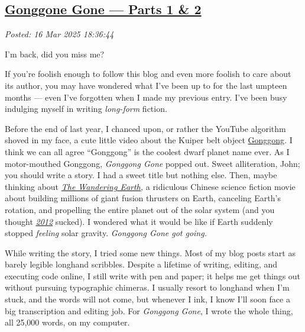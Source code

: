 %

\subsection*{\href{http://analyzethedatanotthedrivel.org/2025/03/16/gonggone-gone-parts-1-2/}{Gonggone Gone --- Parts 1 \& 2}}


\noindent\emph{Posted: 16 Mar 2025 18:36:44}
\vspace{6pt}

I'm back, did you miss me?

If you're foolish enough to follow this blog and even more foolish to
care about its author, you may have wondered what I've been up to for
the last umpteen months --- even I've forgotten when I made my previous
entry. I've been busy indulging myself in writing \emph{long-form}
fiction.

Before the end of last year, I chanced upon, or rather the YouTube
algorithm shoved in my face, a cute little video about the Kuiper belt
object
\href{https://duckduckgo.com/?q=gonggong&t=brave&iax=videos&iai=https\%3A\%2F\%2Fwww.youtube.com\%2Fwatch\%3Fv\%3DNQUMmEMOk-c&ia=videos}{Gonggong}.
I think we can all agree ``Gonggong'' is the coolest dwarf planet name
ever. As I motor-mouthed Gonggong, \emph{Gonggong Gone} popped out.
Sweet alliteration, John; you should write a story. I had a sweet title
but nothing else. Then, maybe thinking about
\emph{\href{https://www.imdb.com/title/tt7605074/}{The Wandering
Earth,}} a ridiculous Chinese science fiction movie about building
millions of giant fusion thrusters on Earth, canceling Earth's rotation,
and propelling the entire planet out of the solar system (and you
thought
\href{https://www.imdb.com/title/tt1190080/?ref_=fn_all_ttl_1}{\emph{2012}}
sucked). I wondered what it would be like if Earth suddenly stopped
\emph{feeling} solar gravity. \emph{Gonggong Gone got going.}

While writing the story, I tried some new things. Most of my blog posts
start as barely legible longhand scribbles. Despite a lifetime of
writing, editing, and executing code online, I still write with pen and
paper; it helps me get things out without pursuing typographic chimeras.
I usually resort to longhand when I'm stuck, and the words will not
come, but whenever I ink, I know I'll soon face a big transcription and
editing job. For \emph{Gonggong Gone}, I wrote the whole thing, all
25,000 words, on my computer.

